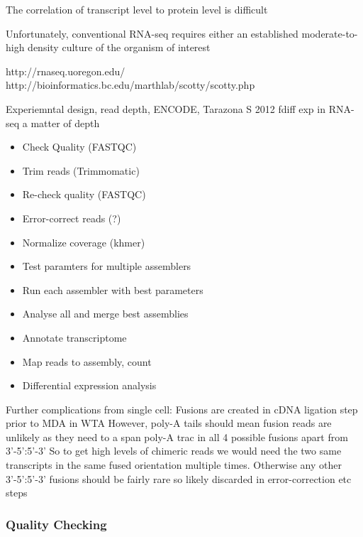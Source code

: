 The correlation of transcript level to protein level is difficult





Unfortunately, conventional RNA-seq requires either an established moderate-to-high
density culture of the organism of interest 








http://rnaseq.uoregon.edu/
http://bioinformatics.bc.edu/marthlab/scotty/scotty.php

Experiemntal design, read depth, ENCODE, Tarazona S 2012 fdiff exp in RNA-seq
a matter of depth

\begin{itemize}
    \item Check Quality (FASTQC)
    \item Trim reads (Trimmomatic)
    \item Re-check quality (FASTQC)
    \item Error-correct reads (?)
    \item Normalize coverage (khmer)
    \item Test paramters for multiple assemblers
    \item Run each assembler with best parameters
    \item Analyse all and merge best assemblies
    \item Annotate transcriptome
    \item Map reads to assembly, count
    \item Differential expression analysis
\end{itemize}










Further complications from single cell:
Fusions are created in cDNA ligation step prior to MDA in WTA
However, poly-A tails should mean fusion reads are unlikely as they need to a
span poly-A trac in all 4 possible fusions apart from 3'-5':5'-3'
So to get high levels of chimeric reads we would need the two same transcripts
in the same fused orientation multiple times.  Otherwise any other 3'-5':5'-3'
fusions should be fairly rare so likely discarded in error-correction etc steps

\subsubsection{Quality Checking}

